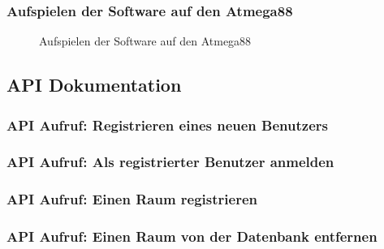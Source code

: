 \subsubsection{Aufspielen der Software auf den Atmega88}
\begin{figure}[H]
\centering
{}
\caption{Aufspielen der Software auf den Atmega88}
\label{fig:Flashing}
\end{figure}





%
\subsection{API Dokumentation}\label{API_Doc}

\subsubsection{API Aufruf: Registrieren eines neuen Benutzers}
\label{app:API_register}

\subsubsection{API Aufruf: Als registrierter Benutzer anmelden}
\label{app:API_login}

\subsubsection{API Aufruf: Einen Raum registrieren}
\label{app:API_register_room}

\subsubsection{API Aufruf: Einen Raum von der Datenbank entfernen}
\label{app:API_delete_room}

